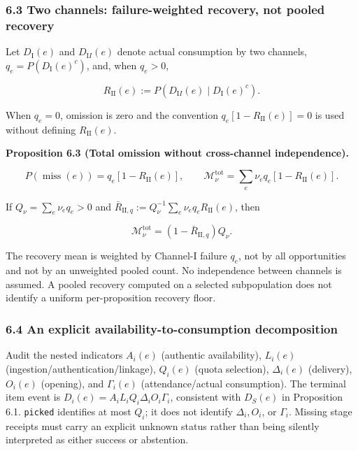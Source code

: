 \documentclass[
  11pt]{article}
\begin{document}
\subsubsection{6.3 Two channels: failure-weighted recovery, not pooled
recovery}\label{two-channels-failure-weighted-recovery-not-pooled-recovery}

Let \(D_{\mathrm I}(e)\) and \(D_{\mathrm II}(e)\) denote actual
consumption by two channels, \(q_e=P(D_{\mathrm I}(e)^c)\), and, when
\(q_e>0\),

\[R_{\mathrm{II}}(e):=P(D_{\mathrm II}(e)\mid D_{\mathrm I}(e)^c).\]

When \(q_e=0\), omission is zero and the convention
\(q_e[1-R_{\mathrm{II}}(e)]=0\) is used without defining
\(R_{\mathrm{II}}(e)\).

\textbf{Proposition 6.3 (Total omission without cross-channel
independence).}

\[P(\operatorname{miss}(e))=q_e[1-R_{\mathrm{II}}(e)],\qquad
\mathcal M_\nu^{\mathrm{tot}}=\sum_e\nu_eq_e[1-R_{\mathrm{II}}(e)].\]

If \(Q_\nu=\sum_e\nu_eq_e>0\) and
\(\bar R_{\mathrm{II},q}:=Q_\nu^{-1}\sum_e\nu_eq_eR_{\mathrm{II}}(e)\),
then

\[\mathcal M_\nu^{\mathrm{tot}}=(1-\bar R_{\mathrm{II},q})Q_\nu.\]

The recovery mean is weighted by Channel-I failure \(q_e\), not by all
opportunities and not by an unweighted pooled count. No independence
between channels is assumed. A pooled recovery computed on a selected
subpopulation does not identify a uniform per-proposition recovery
floor.

\subsubsection{6.4 An explicit availability-to-consumption
decomposition}\label{an-explicit-availability-to-consumption-decomposition}

Audit the nested indicators \(A_i(e)\) (authentic availability),
\(L_i(e)\) (ingestion/authentication/linkage), \(Q_i(e)\) (quota
selection), \(\Delta_i(e)\) (delivery), \(O_i(e)\) (opening), and
\(\Gamma_i(e)\) (attendance/actual consumption). The terminal item event
is \(D_i(e)=A_iL_iQ_i\Delta_iO_i\Gamma_i\), consistent with \(D_S(e)\)
in Proposition 6.1. \texttt{picked} identifies at most \(Q_i\); it does
not identify \(\Delta_i,O_i\), or \(\Gamma_i\). Missing stage receipts
must carry an explicit unknown status rather than being silently
interpreted as either success or abstention.
\end{document}
